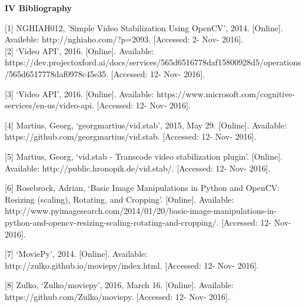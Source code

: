 \documentclass[10pt,draftclsnofoot,onecolumn]{IEEEtran}
\begin{document}
{\Medium\textbf{IV Bibliography}}\\
\vspace{5mm}

[1] NGHIAH012, 'Simple Video Stabilization Using OpenCV', 2014. [Online]. Availeble: http://nghiaho.com/?p=2093. [Accessed: 2- Nov- 2016].\\

 \vspace{2mm}
[2] ‘Video API’, 2016.  [Online]. Available: https://dev.projectoxford.ai/docs/services/565d6516778daf15800928d5/operations/565d6517778daf0978c45e35. [Accessed: 12- Nov- 2016]. \\
 \vspace{2mm}


[3] ‘Video API’, 2016.  [Online]. Available: https://www.microsoft.com/cognitive-services/en-us/video-api. [Accessed: 12- Nov- 2016]. \\
 \vspace{2mm}


[4] Martius, Georg, ‘georgmartius/vid.stab’, 2015, May 29. [Online]. Available: https://github.com/georgmartius/vid.stab. [Accessed: 12- Nov- 2016].\\
 \vspace{2mm}


[5] Martius, Georg, ‘vid.stab - Transcode video stabilization plugin’. [Online]. Available: http://public.hronopik.de/vid.stab/.  [Accessed: 12- Nov- 2016]. \\ 

 \vspace{2mm}

[6] Rosebrock, Adrian, ‘Basic Image Manipulations in Python and OpenCV: Resizing (scaling), Rotating, and Cropping’. [Online]. Available: http://www.pyimagesearch.com/2014/01/20/basic-image-manipulations-in-python-and-opencv-resizing-scaling-rotating-and-cropping/. [Accessed: 12- Nov- 2016]. \\ 

 \vspace{2mm}

[7] ‘MoviePy’, 2014. [Online]. Available: http://zulko.github.io/moviepy/index.html. [Accessed: 12- Nov- 2016].  \\
 \vspace{2mm}


[8] Zulko, ‘Zulko/moviepy’, 2016, March 16. [Online]. Available: https://github.com/Zulko/moviepy.  [Accessed: 12- Nov- 2016]. \\ 
 \vspace{2mm}
\end{document}
